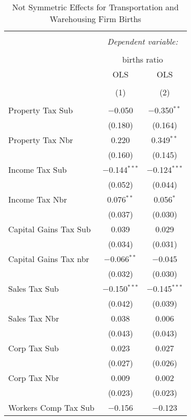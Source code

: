 
\begin{table}[!htbp] \centering 
  \caption{Not Symmetric Effects for  Transportation and Warehousing Firm Births} 
  \label{} 
\begin{tabular}{@{\extracolsep{5pt}}lcc} 
\\[-1.8ex]\hline 
\hline \\[-1.8ex] 
 & \multicolumn{2}{c}{\textit{Dependent variable:}} \\ 
\cline{2-3} 
\\[-1.8ex] & \multicolumn{2}{c}{births ratio} \\ 
 & OLS & OLS \\ 
\\[-1.8ex] & (1) & (2)\\ 
\hline \\[-1.8ex] 
 Property Tax Sub & $-$0.050 & $-$0.350$^{**}$ \\ 
  & (0.180) & (0.164) \\ 
  Property Tax Nbr & 0.220 & 0.349$^{**}$ \\ 
  & (0.160) & (0.145) \\ 
  Income Tax Sub & $-$0.144$^{***}$ & $-$0.124$^{***}$ \\ 
  & (0.052) & (0.044) \\ 
  Income Tax Nbr & 0.076$^{**}$ & 0.056$^{*}$ \\ 
  & (0.037) & (0.030) \\ 
  Capital Gains Tax Sub & 0.039 & 0.029 \\ 
  & (0.034) & (0.031) \\ 
  Capital Gains Tax nbr & $-$0.066$^{**}$ & $-$0.045 \\ 
  & (0.032) & (0.030) \\ 
  Sales Tax Sub & $-$0.150$^{***}$ & $-$0.145$^{***}$ \\ 
  & (0.042) & (0.039) \\ 
  Sales Tax Nbr & 0.038 & 0.006 \\ 
  & (0.043) & (0.043) \\ 
  Corp Tax Sub & 0.023 & 0.027 \\ 
  & (0.027) & (0.026) \\ 
  Corp Tax Nbr & 0.009 & 0.002 \\ 
  & (0.023) & (0.023) \\ 
  Workers Comp Tax Sub & $-$0.156 & $-$0.123 \\ 

\end{tabular}
\end{table}
